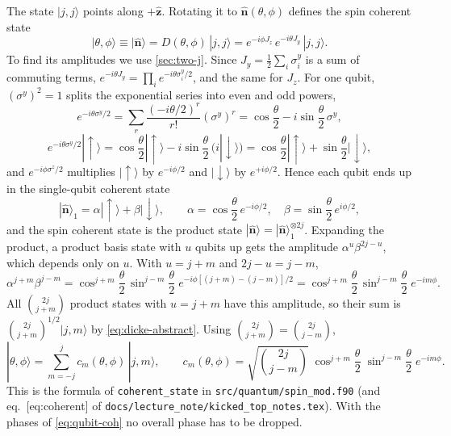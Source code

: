 \documentclass[11pt,a4paper]{article}
\newcommand{\vn}{\hat{\bm n}}
\newcommand{\up}{{\uparrow}}
\newcommand{\dn}{{\downarrow}}
\begin{document}
The state $|j,j\rangle$ points along $+\hat{\bm z}$. Rotating it to $\vn(\theta,\phi)$ defines the spin coherent state
\begin{equation}\label{eq:coh-def}
  |\theta,\phi\rangle \equiv |\vn\rangle = D(\theta,\phi)\,|j,j\rangle = e^{-i\phi J_z}\,e^{-i\theta J_y}\,|j,j\rangle .
\end{equation}
To find its amplitudes we use \cref{sec:two-j}. Since $J_y = \frac12\sum_i\sigma^y_i$ is a sum of commuting terms,
$e^{-i\theta J_y} = \prod_i e^{-i\theta\sigma^y_i/2}$, and the same for $J_z$. For one qubit, $(\sigma^y)^2 = 1$
splits the exponential series into even and odd powers,
\begin{equation*}
  e^{-i\theta\sigma^y/2} = \sum_{r}\frac{(-i\theta/2)^r}{r!}(\sigma^y)^r = \cos\frac\theta2 - i\sin\frac\theta2\,\sigma^y,
\end{equation*}
\begin{equation*}
  e^{-i\theta\sigma^y/2}|\up\rangle = \cos\frac\theta2|\up\rangle - i\sin\frac\theta2\,(i|\dn\rangle)
  = \cos\frac\theta2|\up\rangle + \sin\frac\theta2|\dn\rangle ,
\end{equation*}
and $e^{-i\phi\sigma^z/2}$ multiplies $|\up\rangle$ by $e^{-i\phi/2}$ and $|\dn\rangle$ by $e^{+i\phi/2}$. Hence each
qubit ends up in the single-qubit coherent state
\begin{equation}\label{eq:qubit-coh}
  |\vn\rangle_1 = \alpha|\up\rangle + \beta|\dn\rangle,\qquad
  \alpha = \cos\frac\theta2\,e^{-i\phi/2},\quad \beta = \sin\frac\theta2\,e^{i\phi/2},
\end{equation}
and the spin coherent state is the product state $|\vn\rangle = |\vn\rangle_1^{\otimes 2j}$. Expanding the product,
a product basis state with $u$ qubits up gets the amplitude $\alpha^u\beta^{2j-u}$, which depends only on $u$. With
$u = j+m$ and $2j-u = j-m$,
\begin{equation*}
  \alpha^{j+m}\beta^{j-m} = \cos^{j+m}\!\frac\theta2\,\sin^{j-m}\!\frac\theta2\;e^{-i\phi[(j+m)-(j-m)]/2}
  = \cos^{j+m}\!\frac\theta2\,\sin^{j-m}\!\frac\theta2\;e^{-im\phi}.
\end{equation*}
All $\binom{2j}{j+m}$ product states with $u = j+m$ have this amplitude, so their sum is $\binom{2j}{j+m}^{1/2}|j,m\rangle$
by \eqref{eq:dicke-abstract}. Using $\binom{2j}{j+m} = \binom{2j}{j-m}$,
\begin{equation}\label{eq:coherent}
  \boxed{|\theta,\phi\rangle = \sum_{m=-j}^{j} c_m(\theta,\phi)\,|j,m\rangle,\qquad
  c_m(\theta,\phi) = \sqrt{\binom{2j}{j-m}}\;\cos^{j+m}\!\frac{\theta}{2}\;\sin^{j-m}\!\frac{\theta}{2}\;e^{-im\phi} .}
\end{equation}
This is the formula of \texttt{coherent\_state} in \texttt{src/quantum/spin\_mod.f90} (and eq.\ [eq:coherent] of
\texttt{docs/lecture\_note/kicked\_top\_notes.tex}). With the phases of \eqref{eq:qubit-coh} no overall phase has to be
dropped.
\end{document}
